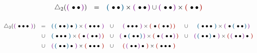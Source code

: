 \documentclass[twoside, 12pt]{amsart}
\theoremstyle{remark}
\begin{document}
\begin{equation*}
  \begin{matrix}
      \triangle_2(\purple{\bullet \bullet}) & = & \blue{\bullet \bullet} \times \purple{\bullet \bullet} \cup \purple{\bullet \bullet} \times \red{\bullet \bullet}
  \end{matrix}
\end{equation*}

\begin{equation*}
  \renewcommand*{\arraystretch}{1.5}
  \begin{matrix}
      \triangle_3(\purple{\bullet \bullet \bullet}) 
      & = & \blue{\blue{\bullet \bullet} \bullet} \times \purple{\bullet \bullet \bullet} 
      & \cup & \purple{\bullet \bullet \bullet} \times \red{\bullet \red{\bullet \bullet}}
      & \cup & \blue{\bullet \bullet \bullet} \times \purple{\bullet \blue{\bullet \bullet}} \\
      & \cup & \blue{\bullet \bullet \bullet} \times \red{\bullet \purple{\bullet \bullet}}  
      & \cup & \purple{\bullet \blue{\bullet \bullet}} \times \red{\bullet \purple{\bullet \bullet}} 
      & \cup & \purple{\blue{\bullet \bullet} \bullet} \times \red{\purple{\bullet \bullet} \bullet} \\
      & \cup & \purple{\blue{\bullet \bullet} \bullet} \times \red{\bullet \bullet \bullet} 
      & \cup & \red{\purple{\bullet \bullet} \bullet} \times \red{\bullet \bullet \bullet} 
  \end{matrix}
\end{equation*}
\end{document}
